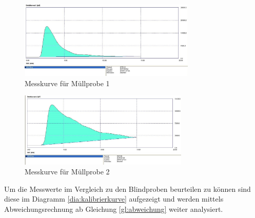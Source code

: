 \begin{figure}[h!]
	\centering
	\includegraphics[width=0.75\textwidth]{img/Muell_V1}
	\caption{Messkurve für Müllprobe 1}
	\label{dia:m1}
\end{figure}
\FloatBarrier

\begin{figure}[h!]
	\centering
	\includegraphics[width=0.72\textwidth]{img/Muell_V2}
	\caption{Messkurve für Müllprobe 2}
	\label{dia:m2}
\end{figure}
\FloatBarrier

\newpage

Um die Messwerte im Vergleich zu den Blindproben beurteilen zu können sind diese im Diagramm \ref{dia:kalibrierkurve} aufgezeigt und werden mittels Abweichungsrechnung ab Gleichung \ref{gl:abweichung} weiter analysiert.

